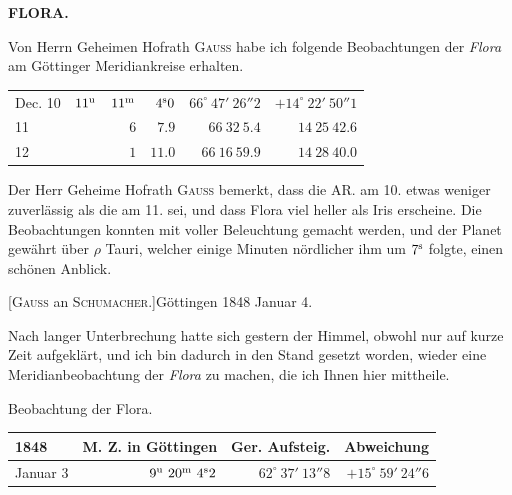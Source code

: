 \clearpage
\noindent{}%
%
\parbox[t]{\dimexpr\linewidth-24mm\relax}{\centering\footnotesize\bfseries FLORA.\par}%
\makebox[12mm][r]{}\par\nobreak\medskip
{}

Von Herrn Geheimen Hofrath \textsc{Gauss} habe ich folgende Beobachtungen der \emph{Flora} am Göttinger Meridiankreise erhalten.

\begin{center}
\setlength{\tabcolsep}{4pt}
\begin{tabular}{l|r r r|r|r}
Dec. 10 & $11^{\rm u}$ & $11^{\rm m}$ & $4^{\rm s}0$ & $66^\circ\ 47'\ 26''2$ & $+14^\circ\ 22'\ 50''1$ \\
\hfill 11 & & $6$ & $7.9$ & $66\ 32\ 5.4$ & $14\ 25\ 42.6$ \\
\hfill 12 & & $1$ & $11.0$ & $66\ 16\ 59.9$ & $14\ 28\ 40.0$ \\
\end{tabular}
\end{center}

Der Herr Geheime Hofrath \textsc{Gauss} bemerkt, dass die AR. am 10. etwas weniger zuverlässig als die am 11. sei, und dass Flora viel heller als Iris erscheine. Die Beobachtungen konnten mit voller Beleuchtung gemacht werden, und der Planet gewährt über $\rho$ Tauri, welcher einige Minuten nördlicher ihm um $7^{\rm s}$ folgte, einen schönen Anblick.

\par{}\bigskip
\hypertarget{native-481-january4}{}
\begin{center}[\textsc{Gauss} an \textsc{Schumacher}.]\quad Göttingen 1848 Januar 4.\end{center}

Nach langer Unterbrechung hatte sich gestern der Himmel, obwohl nur auf kurze Zeit aufgeklärt, und ich bin dadurch in den Stand gesetzt worden, wieder eine Meridianbeobachtung der \emph{Flora} zu machen, die ich Ihnen hier mittheile.

\begin{center}
Beobachtung der Flora.\\[3pt]
\setlength{\tabcolsep}{4pt}
\begin{tabular}{l|r|r|r}
1848 & M. Z. in Göttingen & Ger. Aufsteig. & Abweichung \\\hline
Januar 3 & $9^{\rm u}\ 20^{\rm m}\ 4^{\rm s}2$ & $62^\circ\ 37'\ 13''8$ & $+15^\circ\ 59'\ 24''6$ \\
\end{tabular}
\end{center}

